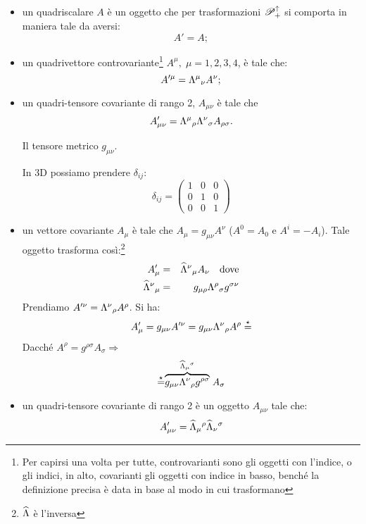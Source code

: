 \begin{itemize}
\item un quadriscalare $A$ \`e un oggetto che per trasformazioni
$\mathscr{P}^{\uparrow}_{+}$ si comporta in maniera tale da aversi:
$$A'=A;$$
\item un quadrivettore controvariante\footnote{Per capirsi
una volta per tutte, controvarianti sono gli oggetti con l'indice,
o gli indici, in alto, covarianti gli oggetti con indice in
basso, bench\'e la definizione precisa \`e data in base al modo in cui 
trasformano} $A^{\mu},\;\mu=1,2,3,4$, \`e tale che:
$$
A'^{\mu}=\Lambda^{\mu}{}_{\nu}A^{\nu};
$$
\item un quadri-tensore covariante di rango 2, $A_{\mu\nu}$ \`e
tale che
$$A'_{\mu\nu}=\Lambda^{\mu}{}_{\rho}\Lambda^{\nu}{}_{\sigma}A_{\rho\sigma}.$$
\begin{esempio}
Il tensore metrico $g_{\mu\nu}$.
\end{esempio}
\begin{esempio}
In 3D possiamo prendere $\delta_{ij}$:
$$
\delta_{ij}=\left(\begin{array}{ccc} 1&0&0\\0&1&0\\0&0&1
\end{array}\right)
$$
\end{esempio}
\item un vettore covariante $A_{\mu}$ \`e tale che
$A_{\mu}=g_{\mu\nu}A^{\nu}$ ($A^0=A_0$ e $A^i=-A_i$). Tale oggetto
trasforma cos\`i:\footnote{$\widehat{\Lambda}$ \`e l'inversa}
\begin{eqnarray*}
A'_{\mu}&=&\widehat{\Lambda}^{\nu}{}_{\mu}A_{\nu} \quad \mbox{dove}\\
\widehat{\Lambda}^{\nu}{}_{\mu}&=&g_{\mu\rho}\Lambda^{\rho}{}_{\sigma}g^{\sigma\nu}
\end{eqnarray*}
Prendiamo $A'^{\nu}=\Lambda^{\nu}{}_{\rho}A^{\rho}$. Si ha:
\begin{equation}
  A'_{\mu}=g_{\mu\nu}A'^{\nu} = g_{\mu\nu}\Lambda^{\nu}{}_{\rho} 
  A^{\rho}\stackrel{\star}{=}
\end{equation}
Dacch\'e $A^{\rho}=g^{\rho\sigma}A_{\sigma}\Longrightarrow$
\begin{equation}
 \stackrel{\star}{=}\stackrel{\widehat{\Lambda}_{\mu}{}^{\sigma}}
{\overbrace{g_{\mu\nu}\Lambda^{\nu}{}_{\rho}g^{\rho\sigma}}}A_{\sigma}
\end{equation}
\item un quadri-tensore covariante di rango 2 \`e un oggetto $A_{\mu\nu}$
tale che:
\begin{equation}
  A_{\mu\nu}'=\widehat{\la}_{\mu}{}^{\rho}\widehat{\la}_{\nu}{}^{\sigma} 

\end{equation}
\end{itemize}
